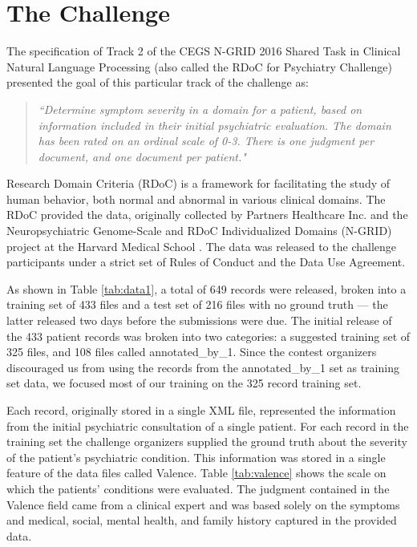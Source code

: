 \chapter{The Challenge}\label{sec:challenge}

The specification of Track 2 of the CEGS N-GRID 2016 Shared Task in Clinical Natural Language Processing  (also called the RDoC for Psychiatry Challenge) presented 
the goal of this particular track of the challenge as:
\begin{quote}
\textsl{``Determine symptom severity in a domain for a patient, based on information included in their initial psychiatric evaluation. The domain has been rated on an ordinal scale of 0-3. There is one judgment per document, and one document per patient."}\cite{N-GRID}
\end{quote}

Research Domain Criteria (RDoC) is a framework for facilitating the study of human behavior,
both normal and abnormal in various clinical domains. The RDoC provided the data,
originally collected by Partners Healthcare Inc. and the Neuropsychiatric Genome-Scale and RDoC
Individualized Domains (N-GRID) project at the Harvard Medical School \cite{N-GRID}.  The data
was released to the challenge participants under a strict set of Rules of Conduct and the Data Use Agreement.

As shown in Table \ref{tab:data1}, a total of 649 records were released,  broken into a training set of 433 files and 
a test set of 216 files with no ground truth --- the latter released two days before
the submissions were due. The initial release of the 433 patient records was broken into two categories: a suggested training set of 325 files, and 108 files
called \textsf{annotated\_by\_1}. Since the contest organizers discouraged us from using the records from the \textsf{annotated\_by\_1} set as training set data, we focused 
most of our training on the 325 record training set.

Each record, originally stored in a single XML file, represented the information from the
initial psychiatric consultation of a single patient. For each record in the training set the challenge organizers supplied the ground truth
about the severity of the patient's psychiatric condition. This information was stored in
a single feature of the data files called \textsf{Valence}.  Table \ref{tab:valence} shows the
scale on which the patients' conditions were evaluated.  The judgment contained in the \textsf{Valence}
field came from a clinical expert and was based solely on the symptoms and medical, social, 
mental health, and family history captured in the provided data.


